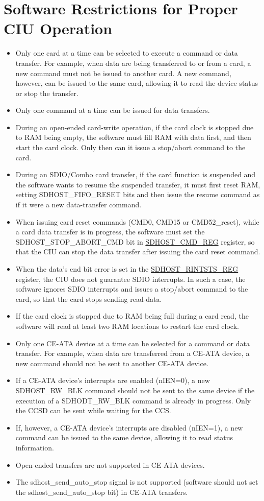 \documentclass[main\_\_EN.tex]{subfiles}
\begin{document}
\section{Software Restrictions for Proper CIU Operation}
\begin{itemize}
	\item Only one card at a time can be selected to execute a command or data transfer. For example, when data are being transferred to or from a card, a new command must not be issued to another card. A new command, however, can be issued to the same card, allowing it to read the device status or stop the transfer.
	\item Only one command at a time can be issued for data transfers.
	\item During an open-ended card-write operation, if the card clock is stopped due to RAM being empty, the software must fill RAM with data first, and then start the card clock. Only then can it issue a stop/abort command to the card.
	\item During an SDIO/Combo card transfer, if the card function is suspended and the software wants to resume the suspended transfer, it must first reset RAM, setting SDHOST\_FIFO\_RESET bits and then issue the resume command as if it were a new data-transfer command.
	\item When issuing card reset commands (CMD0, CMD15 or CMD52\_reset), while a card data transfer is in progress, the software must set the SDHOST\_STOP\_ABORT\_CMD bit in \hyperref[regdesc:CMDREG]{SDHOST\_CMD\_REG} register, so that the CIU can stop the data transfer after issuing the card reset command.
	\item When the data's end bit error is set in the \hyperref[regdesc:RINTSTSREG]{SDHOST\_RINTSTS\_REG} register, the CIU does not guarantee SDIO interrupts. In such a case, the software ignores SDIO interrupts and issues a stop/abort command to the card, so that the card stops sending read-data.
    \item If the card clock is stopped due to RAM being full during a card read, the software will read at least two RAM locations to restart the card clock.
	\item Only one CE-ATA device  at a time can be selected for a command or data transfer. For example, when data are transferred from a CE-ATA device, a new command should not be sent to another CE-ATA device.
	\item If a CE-ATA device's interrupts are enabled (nIEN=0), a new SDHOST\_RW\_BLK command should not be sent to the same device if the execution of a SDHODT\_RW\_BLK command is already in progress. Only the CCSD can be sent while waiting for the CCS.
	\item If, however, a CE-ATA device's interrupts are disabled (nIEN=1), a new command can be issued to the same device, allowing it to read status information.
	\item Open-ended transfers are not supported in CE-ATA devices.
	\item The sdhost\_send\_auto\_stop signal is not supported (software should not set the sdhost\_send\_auto\_stop bit) in CE-ATA transfers.
\end{itemize}
\end{document}
